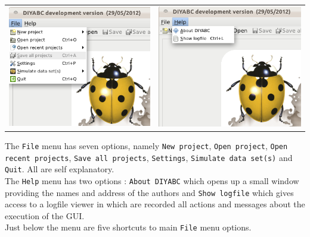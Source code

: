 \begin{center} 
\begin{tabular}{cc}
\includegraphics[scale=0.5]{gui_pictures/Capture-DIYABC-2.png} & \includegraphics[scale=0.5]{gui_pictures/Capture-DIYABC-3.png}\\
\end{tabular}
\end{center}

The \texttt{File} menu has seven options, namely \texttt{New project}, \texttt{Open project}, \texttt{Open recent projects}, \texttt{Save all projects}, \texttt{Settings}, \texttt{Simulate data set(s)} and \texttt{Quit}. All are self explanatory.\\
The \texttt{Help} menu has two options : \texttt{About DIYABC} which opens up a small window providing the names and address of the authors and \texttt{Show logfile} which gives access to a logfile viewer in which are recorded all actions and messages about the execution of the GUI.\\ 
Just below the menu are five shortcuts to main \texttt{File} menu options.\\


